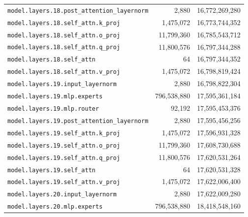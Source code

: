 \documentclass[10pt,a4paper]{article}
\theoremstyle{definition}
\begin{document}
\begin{appendices}
\begin{longtable}{p{9.5cm}rr}
\texttt{model.\allowbreak{}layers.\allowbreak{}18.\allowbreak{}post\_attention\_layernorm} & 2,880 & 16,772,269,280 \\
\texttt{model.\allowbreak{}layers.\allowbreak{}18.\allowbreak{}self\_attn.\allowbreak{}k\_proj} & 1,475,072 & 16,773,744,352 \\
\texttt{model.\allowbreak{}layers.\allowbreak{}18.\allowbreak{}self\_attn.\allowbreak{}o\_proj} & 11,799,360 & 16,785,543,712 \\
\texttt{model.\allowbreak{}layers.\allowbreak{}18.\allowbreak{}self\_attn.\allowbreak{}q\_proj} & 11,800,576 & 16,797,344,288 \\
\texttt{model.\allowbreak{}layers.\allowbreak{}18.\allowbreak{}self\_attn} & 64 & 16,797,344,352 \\
\texttt{model.\allowbreak{}layers.\allowbreak{}18.\allowbreak{}self\_attn.\allowbreak{}v\_proj} & 1,475,072 & 16,798,819,424 \\
\texttt{model.\allowbreak{}layers.\allowbreak{}19.\allowbreak{}input\_layernorm} & 2,880 & 16,798,822,304 \\
\texttt{model.\allowbreak{}layers.\allowbreak{}19.\allowbreak{}mlp.\allowbreak{}experts} & 796,538,880 & 17,595,361,184 \\
\texttt{model.\allowbreak{}layers.\allowbreak{}19.\allowbreak{}mlp.\allowbreak{}router} & 92,192 & 17,595,453,376 \\
\texttt{model.\allowbreak{}layers.\allowbreak{}19.\allowbreak{}post\_attention\_layernorm} & 2,880 & 17,595,456,256 \\
\texttt{model.\allowbreak{}layers.\allowbreak{}19.\allowbreak{}self\_attn.\allowbreak{}k\_proj} & 1,475,072 & 17,596,931,328 \\
\texttt{model.\allowbreak{}layers.\allowbreak{}19.\allowbreak{}self\_attn.\allowbreak{}o\_proj} & 11,799,360 & 17,608,730,688 \\
\texttt{model.\allowbreak{}layers.\allowbreak{}19.\allowbreak{}self\_attn.\allowbreak{}q\_proj} & 11,800,576 & 17,620,531,264 \\
\texttt{model.\allowbreak{}layers.\allowbreak{}19.\allowbreak{}self\_attn} & 64 & 17,620,531,328 \\
\texttt{model.\allowbreak{}layers.\allowbreak{}19.\allowbreak{}self\_attn.\allowbreak{}v\_proj} & 1,475,072 & 17,622,006,400 \\
\texttt{model.\allowbreak{}layers.\allowbreak{}20.\allowbreak{}input\_layernorm} & 2,880 & 17,622,009,280 \\
\texttt{model.\allowbreak{}layers.\allowbreak{}20.\allowbreak{}mlp.\allowbreak{}experts} & 796,538,880 & 18,418,548,160 \\

\end{longtable}
\end{appendices}
\end{document}

